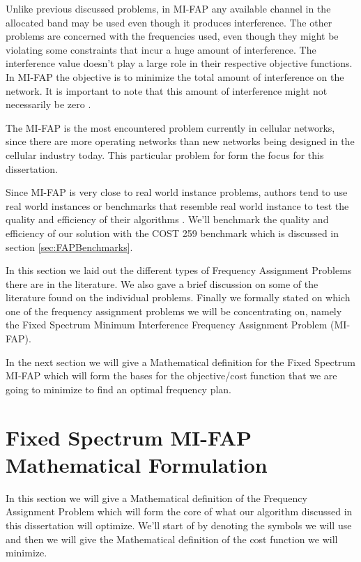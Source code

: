Unlike previous discussed problems, in MI-FAP any available channel in the allocated band may be used even though it produces interference. The other problems are concerned with the frequencies used, even though they might be violating some constraints that incur a huge amount of interference. The interference value doesn't play a large role in their respective objective functions. In MI-FAP the objective is to minimize the total amount of interference on the network. It is important to note that this amount of interference might not necessarily be zero \cite{Karen2004,Eisenblatter,MontemanniThesis,MultipleBinaryFAP}.

The MI-FAP is the most encountered problem currently in cellular networks, since there are more operating networks than new networks being designed in the cellular industry today. This particular problem for form the focus for this dissertation. 

Since MI-FAP is very close to real world instance problems, authors tend to use real world instances or benchmarks that resemble real world instance to test the quality and efficiency of their algorithms \cite{Karen2004,Eisenblatter,MontemanniThesis,MultipleBinaryFAP}. We'll benchmark the quality and efficiency of our solution with the COST 259 benchmark which is discussed in section \ref{sec:FAPBenchmarks}.

In this section we laid out the different types of Frequency Assignment Problems there are in the literature. We also gave a brief discussion on some of the literature found on the individual problems. Finally we formally stated on which one of the frequency assignment problems we will be concentrating on, namely the Fixed Spectrum Minimum Interference Frequency Assignment Problem (MI-FAP). 

In the next section we will give a Mathematical definition for the Fixed Spectrum MI-FAP which will form the bases for the objective/cost function that we are going to minimize to find an optimal frequency plan.
\section{Fixed Spectrum MI-FAP Mathematical Formulation}
\label{sec:FAPMathDef}
In this section we will give a Mathematical definition of the Frequency Assignment Problem which will form the core of what our algorithm discussed in this dissertation will optimize. We'll start of by denoting the symbols we will use and then we will give the Mathematical definition of the cost function we will minimize.

